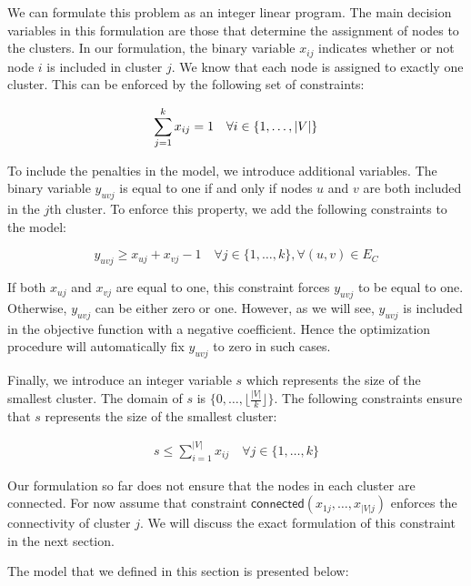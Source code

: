 \documentclass[conference]{IEEEtran}
\begin{document}
We can formulate this problem as an integer linear program. The main
decision variables in this formulation are those that determine the
assignment of nodes to the clusters. In our formulation, the binary
variable $x_{ij}$ indicates whether or not node $i$ is included in
cluster $j$. We know that each node is assigned to exactly one
cluster. This can be enforced by the following set of constraints:

\begin{equation}
\sum_{j=1}^k x_{ij} = 1 \quad \forall i \in \{1, \ldots, |V|\} \label{cons:assign}\\
\end{equation}

To include the penalties in the model, we introduce additional
variables. The binary variable $y_{uvj}$ is equal to one if and only if
nodes $u$ and $v$ are both included in the $j$th cluster. To enforce
this property, we add the following constraints to the model:

\begin{equation}
y_{uvj} \geq x_{uj} + x_{vj} -1 \quad \forall j \in \{1, \ldots, k\}, \forall (u, v) \in E_{C}
\end{equation}

If both $x_{uj}$ and $x_{vj}$ are equal to one, this constraint forces
$y_{uvj}$ to be equal to one. Otherwise, $y_{uvj}$ can be either zero or
one. However, as we will see, $y_{uvj}$ is included in the objective
function with a negative coefficient. Hence the optimization procedure
will automatically fix $y_{uvj}$ to zero in such cases.

Finally, we introduce an integer variable $s$ which represents the size
of the smallest cluster. The domain of $s$ is
$\{0, \ldots, \lfloor \frac{|V|}{k} \rfloor \}$. The following constraints
ensure that $s$ represents the size of the smallest cluster:

\begin{align}
s \leq \sum_{i=1}^{|V|} x_{ij} \quad \forall j \in \{1, \ldots, k\}
\end{align}

Our formulation so far does not ensure that the nodes in each cluster
are connected. For now assume that constraint
$\mathsf{connected}(x_{1j}, \ldots, x_{|V|j})$ enforces the connectivity of
cluster $j$. We will discuss the exact formulation of this constraint in
the next section. 

The model that we defined in this section is presented
below:
\end{document}
